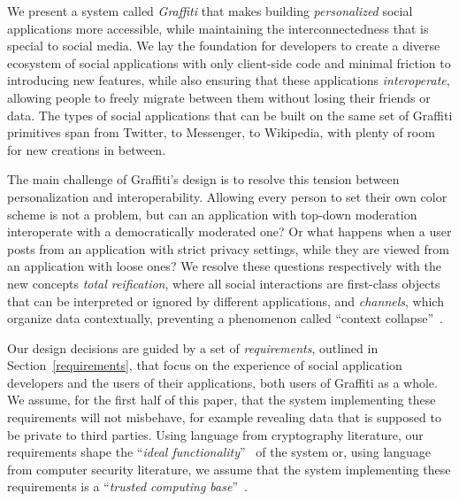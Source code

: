 We present a system called \emph{Graffiti} that makes
building \emph{personalized} social applications more accessible,
while maintaining the interconnectedness that is special to social media.
We lay the foundation for developers to create a diverse ecosystem
of social applications
with only client-side code and minimal friction
to introducing new features,
while also ensuring that these applications \emph{interoperate},
allowing people to freely migrate between them without
losing their friends or data.
The types of social applications that can be built on the same set
of Graffiti primitives span from Twitter, to Messenger, to Wikipedia,
with plenty of room for new creations in between.

The main challenge of Graffiti's design is to resolve
this tension between personalization and interoperability.
Allowing every person to set their own color scheme is
not a problem, but can an application with top-down
moderation interoperate with a democratically moderated one?
Or what happens when a user posts from an application with strict privacy settings,
while they are viewed from an application with loose ones?
We resolve these questions respectively with the
new concepts \emph{total reification},
where all social interactions are first-class objects that
can be interpreted or ignored by different applications,
and \emph{channels}, which organize data contextually,
preventing a phenomenon called ``context collapse''~\cite{contextcollapse}.



Our design decisions are guided by a set of \emph{requirements}, outlined
in Section~\ref{requirements}, that focus on the experience
of social application developers and the users of their applications,
both users of Graffiti as a whole.
We assume, for the first half of this paper, that the system implementing these requirements
will not misbehave, for example revealing data that is supposed to be private to third parties.
Using language from cryptography literature,
our requirements shape the
``\emph{ideal functionality}''~\cite{universallycomposable}
of the system or, using language from computer security literature,
we assume that the system implementing these requirements is a ``\emph{trusted computing base}''~\cite{tcb}.

